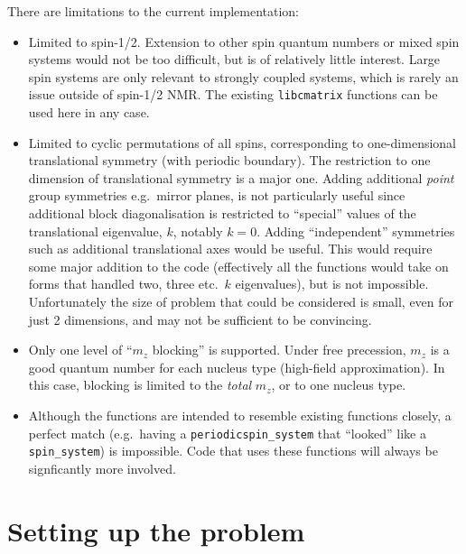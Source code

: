 \documentclass[11pt,a4paper]{article}
\begin{document}
There are limitations to the current implementation:
\begin{itemize}
\item Limited to spin-1/2.  Extension to other spin quantum numbers
or mixed spin systems would not be too difficult, but is of relatively
little interest.  Large spin systems are only relevant to strongly
coupled systems, which is rarely an issue outside of spin-1/2 NMR\@.
The existing {\tt libcmatrix} functions can be used here in any case.

\item Limited to cyclic permutations of all spins, corresponding
to one-dimensional translational symmetry (with periodic boundary).
The restriction to one dimension of translational symmetry
is a major one.  Adding additional \emph{point} group symmetries
e.g.\ mirror planes, is not particularly useful since additional
block diagonalisation is restricted to ``special'' values of the
translational eigenvalue, $k$, notably $k=0$.  
Adding ``independent'' symmetries such as additional translational
axes would be useful.  This would require some major addition to the
code (effectively all the functions would take on forms that
handled two, three etc.\ $k$ eigenvalues), but is not impossible.
Unfortunately the size of problem that
could be considered is small, even for just 2 dimensions, and may not be sufficient to be
convincing.

\item Only one level of ``$m_z$ blocking'' is supported.  Under free precession,
$m_z$ is a good quantum number for each nucleus type (high-field approximation).
In this case, blocking is limited to the \emph{total} $m_z$, or to one nucleus
type.

\item Although the functions are intended to resemble existing
functions closely, a perfect match
(e.g.\ having a {\tt periodicspin\_system} that ``looked''
like a {\tt spin\_system}) is impossible.  Code that uses
these functions will always be signficantly more involved.

\end{itemize}


\section{Setting up the problem}
\end{document}

